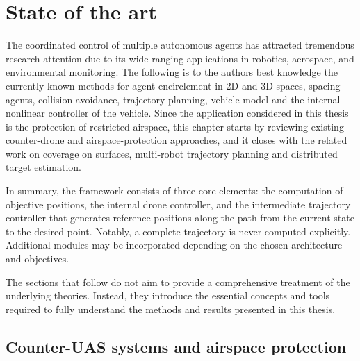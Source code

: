
%

\chapter{State of the art} \label{cha:State of the art}

\glsresetall

The coordinated control of multiple autonomous agents has attracted tremendous research attention due to its wide-ranging applications in robotics, aerospace, and environmental monitoring. The following is to the authors best knowledge the currently known methods for agent encirclement in \gls{2D} and \gls{3D} spaces, spacing agents, collision avoidance, trajectory planning, vehicle model and the internal nonlinear controller of the vehicle. Since the application considered in this thesis is the protection of restricted airspace, this chapter starts by reviewing existing counter-drone and airspace-protection approaches, and it closes with the related work on coverage on surfaces, multi-robot trajectory planning and distributed target estimation.

In summary, the framework consists of three core elements: the computation of objective positions, the internal drone controller, and the intermediate trajectory controller that generates reference positions along the path from the current state to the desired point. Notably, a complete trajectory is never computed explicitly. Additional modules may be incorporated depending on the chosen architecture and objectives.

The sections that follow do not aim to provide a comprehensive treatment of the underlying theories. Instead, they introduce the essential concepts and tools required to fully understand the methods and results presented in this thesis.

\section{Counter-UAS systems and airspace protection} \label{sec.2:Counter-UAS}

